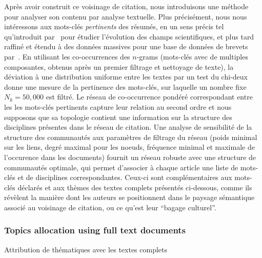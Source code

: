 {Après avoir construit ce voisinage de citation, nous introduisons une méthode pour analyser son contenu par analyse textuelle. Plus précisément, nous nous intéressons aux mots-clés \emph{pertinents} des résumés, en un sens précis tel qu'introduit par~\cite{chavalarias2013phylomemetic} pour étudier l'évolution des champs scientifiques, et plus tard raffiné et étendu à des données massives pour une base de données de brevets par~\cite{bergeaud2017classifying}. En utilisant les co-occurrences des $n$-grams (mots-clés avec de multiples composantes, obtenus après un premier filtrage et nettoyage de texte), la déviation à une distribution uniforme entre les textes par un test du chi-deux donne une mesure de la pertinence des mots-clés, sur laquelle un nombre fixe $N_k = 50,000$ est filtré. Le réseau de co-occurrence pondéré correspondant entre les les mots-clés pertinents capture leur relation au second ordre et nous supposons que sa topologie contient une information sur la structure des disciplines présentes dans le réseau de citation. Une analyse de sensibilité de la structure des communautés aux paramètres de filtrage du réseau (poids minimal sur les liens, degré maximal pour les noeuds, fréquence minimal et maximale de l'occurence dans les documents) fournit un réseau robuste avec une structure de communautés optimale, qui permet d'associer à chaque article une liste de mots-clés et de disciplines correspondantes. Ceux-ci sont complémentaires aux mots-clés déclarés et aux thèmes des textes complets présentés ci-dessous, comme ils révèlent la manière dont les auteurs se positionnent dans le paysage sémantique associé au voisinage de citation, ou ce qu'est leur ``bagage culturel''.
}


\subsubsection{Topics allocation using full text documents}{Attribution de thématiques avec les textes complets}

